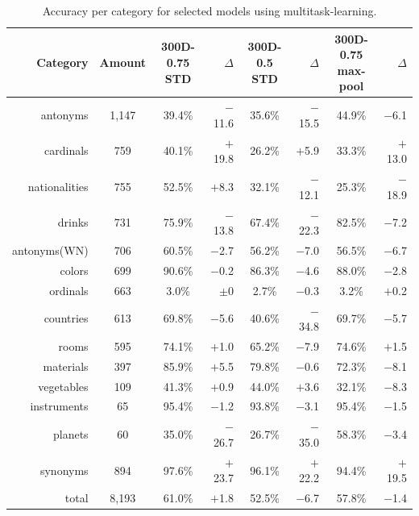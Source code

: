 \begin{table}[tph!]
\centering
\begin{tabular}{rc|cr|cr|cr}
\textbf{Category}  & \textbf{Amount}& \specialcellc{\textbf{300D-0.75}\\\textbf{STD}} & $\Delta$ &  \specialcellc{\textbf{300D-0.5}\\\textbf{STD}} & $\Delta$ & \specialcellc{\textbf{300D-0.75}\\\textbf{max-pool}} & $\Delta$\\
\toprule
antonyms & 1,147 & 39.4\% & $-$11.6 & 35.6\% & $-$15.5 & 44.9\% & $-$6.1 \\
cardinals & 759 & 40.1\% & $+$19.8 & 26.2\% & $+$5.9  & 33.3\% & $+$13.0\\
nationalities & 755 & 52.5\% & $+$8.3 & 32.1\% & $-$12.1 & 25.3\%  & $-$18.9\\
drinks & 731 & 75.9\% & $-$13.8 & 67.4\% & $-$22.3 & 82.5\% & $-$7.2\\
antonyms(WN) & 706 & 60.5\% & $-$2.7 & 56.2\% & $-$7.0 & 56.5\% & $-$6.7\\
colors & 699 & 90.6\% & $-$0.2 & 86.3\% & $-$4.6 & 88.0\% & $-$2.8\\
ordinals & 663 & 3.0\% & $\pm$0 & 2.7\% & $-$0.3 & 3.2\% & $+$0.2\\
countries & 613 & 69.8\% & $-$5.6 & 40.6\% & $-$34.8 & 69.7\% & $-$5.7\\
rooms & 595 & 74.1\% & $+$1.0 & 65.2\% & $-$7.9 & 74.6\% & $+$1.5\\
materials & 397 & 85.9\% & $+$5.5 & 79.8\% & $-$0.6 & 72.3\% & $-$8.1\\
vegetables & 109 & 41.3\% & $+$0.9 & 44.0\% & $+$3.6 & 32.1\% & $-$8.3\\
instruments & 65 & 95.4\% & $-$1.2 & 93.8\% & $-$3.1 & 95.4\% & $-$1.5\\
planets & 60 & 35.0\% & $-$26.7 & 26.7\% & $-$35.0 & 58.3\% & $-$3.4\\
\midrule
synonyms & 894 & 97.6\% & $+$23.7 & 96.1\% & $+$22.2 & 94.4\% & $+$19.5\\
\midrule
total & 8,193 & 61.0\% & $+$1.8 & 52.5\% & $-$6.7 & 57.8\% & $-$1.4\\
\bottomrule
\end{tabular}
\caption{Accuracy per category for selected models using multitask-learning.}
\label{tab:categories_mt}
\end{table}
